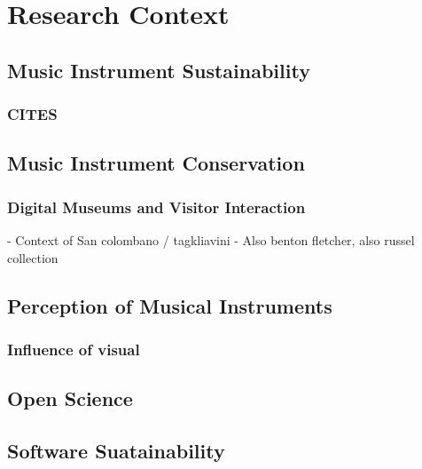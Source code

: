 \chapter{Research Context}
\section{Music Instrument Sustainability}
\subsection{CITES}
\section{Music Instrument Conservation}
\subsection{Digital Museums and Visitor Interaction}
- Context of San colombano / tagkliavini 
- Also benton fletcher, also russel collection
\section{Perception of Musical Instruments}
\subsection{Influence of visual}

\section{Open Science}
\section{Software Suatainability}

